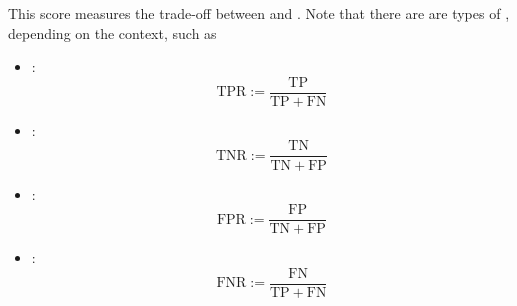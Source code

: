 \documentclass[a4paper, 12pt]{report}
\begin{document}
    This score measures the trade-off between  and . Note that there are are types of , depending on the context, such as
    
    \begin{itemize}
        \item {}: $$\mathrm{TPR} := \dfrac{\mathrm{TP}}{\mathrm{TP} + \mathrm{FN}}$$
        \item {}: $$\mathrm{TNR} := \dfrac{\mathrm{TN}}{\mathrm{TN} + \mathrm{FP}}$$
        \item {}: $$\mathrm{FPR} := \dfrac{\mathrm{FP}}{\mathrm{TN} + \mathrm{FP}}$$
        \item {}: $$\mathrm{FNR} := \dfrac{\mathrm{FN}}{\mathrm{TP} + \mathrm{FN}}$$
    \end{itemize}
\end{document}
